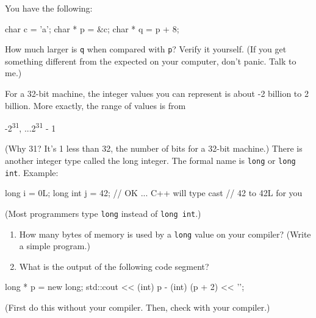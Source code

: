 \begin{ex}
You have the following:

\begin{consolethree}[escapeinside=||]
char c = 'a';
char * p = &c;
char * q = p + 8;
\end{consolethree}

How much larger is \texttt{q} when compared with \texttt{p}? Verify it
yourself. (If you get something different from the expected on your
computer, don't panic. Talk to me.)
\end{ex}

\begin{ex}
For a 32-bit machine, the integer values you can represent is
about -2 billion to 2 billion. More exactly, the range of values is from

-2\textsuperscript{31}, ...2\textsuperscript{31} - 1

(Why 31? It's 1 less than 32, the number of bits for a
32-bit machine.) There is another integer type called the long integer.
The formal name is \texttt{long} or \texttt{long int}. Example:

\begin{consolethree}[escapeinside=||]
long i = 0L;
long int j = 42; // OK ... C++ will type cast
                 // 42 to 42L for you
\end{consolethree}

(Most programmers type \texttt{long} instead of \texttt{long int}.)

\begin{enumerate}
\def\labelenumi{(\alph{enumi})}
\item How many bytes of memory is used by a \texttt{long} value on your
  compiler? (Write a simple program.)
\item What is the output of the following code segment?
\end{enumerate}

\begin{consolethree}[escapeinside=||]
long * p = new long;
std::cout << (int) p - (int) (p + 2) << '\n';
\end{consolethree}

(First do this without your compiler. Then, check with your compiler.)
\end{ex}

